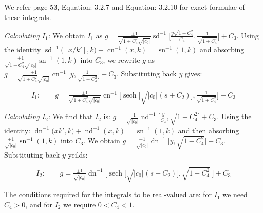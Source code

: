 \documentclass[12pt]{article}
\theoremstyle{plain}
\theoremstyle{definition}
\theoremstyle{remark}
\begin{document}
  \noindent
  We refer \cite{La} page 53, Equation: 3.2.7 and Equation: 3.2.10 for exact formulae of these integrals. 
  
   \textit{Calculating \(I_1\): } We obtain \(I_1\) as \footnotesize\(g=\tfrac{\pm 1}{\sqrt{1+C_4^2}\sqrt{|c_0|}}\operatorname{sd}^{-1}\big[\tfrac{y\sqrt{1+C_4^2}}{C_4},\tfrac{1}{\sqrt{1+C_4^2}}\big]+C_3\)\normalsize. Using the identity \(\operatorname{sd}^{-1}\!\big([x/k'],k\big)+\operatorname{cn}^{-1}(x,k)=\operatorname{sn}^{-1}(1,k)\) and absorbing \(\tfrac{\pm 1}{\sqrt{1+C_4^2}\sqrt{|c_0|}}\operatorname{sn}^{-1}(1,k)\) into \(C_3\), we rewrite \(g\) as \footnotesize\(g=\tfrac{\pm 1}{\sqrt{1+C_4^2}\sqrt{|c_0|}}\operatorname{cn}^{-1}\big[y,\tfrac{1}{\sqrt{1+C_4^2}}\big]+C_3\)\normalsize. Substituting back \(y\) gives:
  
  \begin{equation}\label{eqn: soln k<0, c_0 neq 0, g: case 1.1}
  	\boxed{I_1:\qquad g=\tfrac{\pm 1}{\sqrt{1+C_4^2}\sqrt{|c_0|}}\operatorname{cn}^{-1}\big[\operatorname{sech}\!\big[\sqrt{|c_0|}(s+C_2)\big],\tfrac{1}{\sqrt{1+C_4^2}}\big]+C_3}
  \end{equation}

  \textit{Calculating \(I_2\): } We find that \(I_2\) is: \footnotesize\(g=\tfrac{\pm 1}{\sqrt{|c_0|}}\operatorname{nd}^{-1}\big[\tfrac{y}{C_4},\sqrt{1-C_4^2}\big]+C_3\)\normalsize. Using the identity: \(\operatorname{dn}^{-1}\!\big(xk',k\big)+\operatorname{nd}^{-1}(x,k)=\operatorname{sn}^{-1}(1,k)\) and then absorbing \(\tfrac{\pm 1}{\sqrt{|c_0|}}\operatorname{sn}^{-1}(1,k)\) into \(C_3\). We obtain \footnotesize\(g=\tfrac{\pm 1}{\sqrt{|c_0|}}\operatorname{dn}^{-1}\big[y,\sqrt{1-C_4^2}\big]+C_3\)\normalsize. Substituting back \(y\) yeilds:
  
  \begin{equation}\label{eqn: soln k<0, c_0 neq 0, g: case 1.2}
	\boxed{I_2:\qquad g=\tfrac{\pm 1}{\sqrt{|c_0|}}\operatorname{dn}^{-1}\Big[\operatorname{sech}\!\big[\sqrt{|c_0|}(s+C_2)\big],\sqrt{1-C_4^2}\;\Big]+C_3}
 \end{equation}
  
  \noindent
  The conditions required for the integrals to be real‑valued are: for \(I_1\) we need \(C_4>0\), and for \(I_2\) we require \(0<C_4<1\).\\
\end{document}
